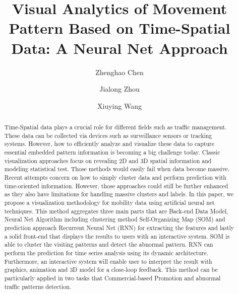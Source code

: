 \documentclass[runningheads,a4paper]{llncs}
\begin{document}
\title{Visual  Analytics  of  Movement Pattern Based on Time-Spatial Data: A Neural Net Approach}
\author{Zhenghao Chen\and Jialong Zhou\and Xiuying Wang}


\maketitle              %

\begin{abstract}
Time-Spatial data plays a crucial role for different fields such as traffic management. These data can be collected via devices such as surveillance sensors or tracking systems. However, how to efficiently analyze and visualize these data to capture essential embedded pattern information is becoming a big challenge today. Classic visualization approaches focus on revealing 2D and 3D spatial  information and modeling statistical test. Those methods would easily fail when data become massive. Recent attempts concern on how to simply cluster data and perform prediction with time-oriented information. However, those approaches could still be further enhanced as they also have limitations for handling massive clusters and labels. In this paper, we propose a visualization methodology for mobility data using artificial neural net techniques. This method aggregates three main parts that are Back-end Data Model, Neural Net Algorithm including clustering method Self-Organizing Map (SOM) and prediction approach Recurrent Neural Net (RNN) for extracting the features and lastly a solid front-end that displays the results to users with an interactive system. SOM is able to cluster the visiting patterns and detect the abnormal pattern. RNN can perform the prediction for time series analysis using its dynamic architecture. Furthermore, an interactive system will enable user to interpret the result with graphics, animation and 3D model for a close-loop feedback. This method can be particularly applied in two tasks that Commercial-based Promotion and abnormal traffic patterns detection. 
\end{abstract}
\end{document}
